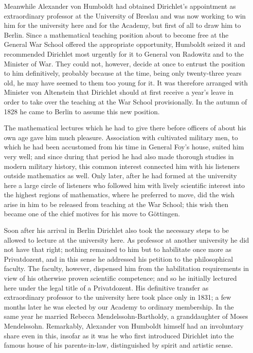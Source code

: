\documentclass[11pt]{article}
\begin{document}
Meanwhile Alexander von Humboldt had obtained Dirichlet's appointment as extraordinary professor at the University of Breslau and was now working to win him for the university here and for the Academy, but first of all to draw him to Berlin. Since a mathematical teaching position about to become free at the General War School offered the appropriate opportunity, Humboldt seized it and recommended Dirichlet most urgently for it to General von Radowitz and to the Minister of War. They could not, however, decide at once to entrust the position to him definitively, probably because at the time, being only twenty-three years old, he may have seemed to them too young for it. It was therefore arranged with Minister von Altenstein that Dirichlet should at first receive a year's leave in order to take over the teaching at the War School provisionally. In the autumn of 1828 he came to Berlin to assume this new position.

The mathematical lectures which he had to give there before officers of about his own age gave him much pleasure. Association with cultivated military men, to which he had been accustomed from his time in General Foy's house, suited him very well; and since during that period he had also made thorough studies in modern military history, this common interest connected him with his listeners outside mathematics as well. Only later, after he had formed at the university here a large circle of listeners who followed him with lively scientific interest into the highest regions of mathematics, where he preferred to move, did the wish arise in him to be released from teaching at the War School; this wish then became one of the chief motives for his move to Göttingen.

Soon after his arrival in Berlin Dirichlet also took the necessary steps to be allowed to lecture at the university here. As professor at another university he did not have that right; nothing remained to him but to habilitate once more as Privatdozent, and in this sense he addressed his petition to the philosophical faculty. The faculty, however, dispensed him from the habilitation requirements in view of his otherwise proven scientific competence; and so he initially lectured here under the legal title of a Privatdozent. His definitive transfer as extraordinary professor to the university here took place only in 1831; a few months later he was elected by our Academy to ordinary membership. In the same year he married Rebecca Mendelssohn-Bartholdy, a granddaughter of Moses Mendelssohn. Remarkably, Alexander von Humboldt himself had an involuntary share even in this, insofar as it was he who first introduced Dirichlet into the famous house of his parents-in-law, distinguished by spirit and artistic sense.
\end{document}
